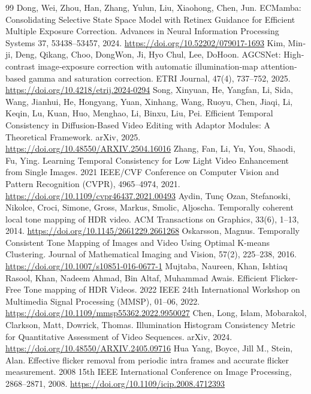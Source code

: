 \documentclass[twocolumn,10pt]{svjour3}
\begin{document}
\begin{thebibliography}{99}
 Dong, Wei, Zhou, Han, Zhang, Yulun, Liu, Xiaohong, Chen, Jun. ECMamba: Consolidating Selective State Space Model with Retinex Guidance for Efficient Multiple Exposure Correction. Advances in Neural Information Processing Systems 37, 53438–53457, 2024. \url{https://doi.org/10.52202/079017-1693}
 Kim, Min‐ji, Deng, Qikang, Choo, DongWon, Ji, Hyo Chul, Lee, DoHoon. AGCSNet: High‐contrast image‐exposure correction with automatic illumination‐map attention‐based gamma and saturation correction. ETRI Journal, 47(4), 737–752, 2025. \url{https://doi.org/10.4218/etrij.2024-0294}
 Song, Xinyuan, He, Yangfan, Li, Sida, Wang, Jianhui, He, Hongyang, Yuan, Xinhang, Wang, Ruoyu, Chen, Jiaqi, Li, Keqin, Lu, Kuan, Huo, Menghao, Li, Binxu, Liu, Pei. Efficient Temporal Consistency in Diffusion-Based Video Editing with Adaptor Modules: A Theoretical Framework. arXiv, 2025. \url{https://doi.org/10.48550/ARXIV.2504.16016}
 Zhang, Fan, Li, Yu, You, Shaodi, Fu, Ying. Learning Temporal Consistency for Low Light Video Enhancement from Single Images. 2021 IEEE/CVF Conference on Computer Vision and Pattern Recognition (CVPR), 4965–4974, 2021. \url{https://doi.org/10.1109/cvpr46437.2021.00493}
 Aydin, Tunç Ozan, Stefanoski, Nikolce, Croci, Simone, Gross, Markus, Smolic, Aljoscha. Temporally coherent local tone mapping of HDR video. ACM Transactions on Graphics, 33(6), 1–13, 2014. \url{https://doi.org/10.1145/2661229.2661268}
 Oskarsson, Magnus. Temporally Consistent Tone Mapping of Images and Video Using Optimal K-means Clustering. Journal of Mathematical Imaging and Vision, 57(2), 225–238, 2016. \url{https://doi.org/10.1007/s10851-016-0677-1}
 Mujtaba, Naureen, Khan, Ishtiaq Rasool, Khan, Nadeem Ahmad, Bin Altaf, Muhammad Awais. Efficient Flicker-Free Tone mapping of HDR Videos. 2022 IEEE 24th International Workshop on Multimedia Signal Processing (MMSP), 01–06, 2022. \url{https://doi.org/10.1109/mmsp55362.2022.9950027}
 Chen, Long, Islam, Mobarakol, Clarkson, Matt, Dowrick, Thomas. Illumination Histogram Consistency Metric for Quantitative Assessment of Video Sequences. arXiv, 2024. \url{https://doi.org/10.48550/ARXIV.2405.09716}
 Hua Yang, Boyce, Jill M., Stein, Alan. Effective flicker removal from periodic intra frames and accurate flicker measurement. 2008 15th IEEE International Conference on Image Processing, 2868–2871, 2008. \url{https://doi.org/10.1109/icip.2008.4712393}

\end{thebibliography}
\end{document}
